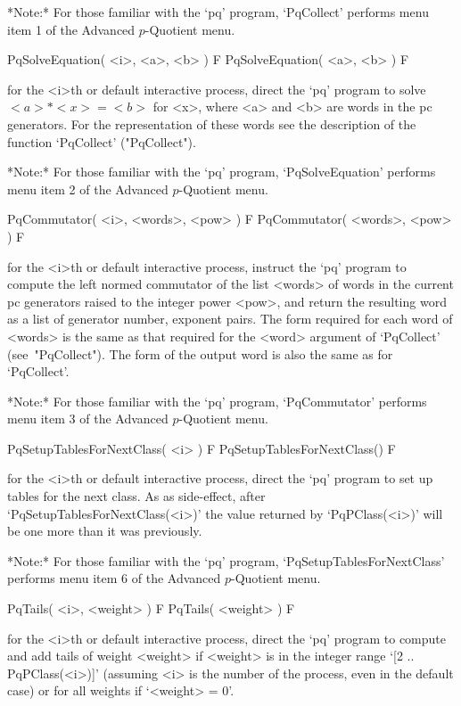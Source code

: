 \endlist

*Note:* For those familiar with the  `pq'  program,  `PqCollect'  performs
menu item 1 of the Advanced $p$-Quotient menu.

\>PqSolveEquation( <i>, <a>, <b> ) F
\>PqSolveEquation( <a>, <b> ) F

for the  <i>th or default  interactive {\ANUPQ} process, direct  the `pq'
program to solve $<a>  * <x> = <b>$ for <x>, where  <a> and <b> are words
in the pc generators. For the  representation  of  these  words  see  the
description of the function `PqCollect' ("PqCollect").

*Note:* 
For those familiar  with  the  `pq'  program,  `PqSolveEquation'  performs
menu item 2 of the Advanced $p$-Quotient menu.

\>PqCommutator( <i>, <words>, <pow> ) F
\>PqCommutator( <words>, <pow> ) F

for the <i>th or default interactive {\ANUPQ} process, instruct the  `pq'
program to compute the left normed commutator  of  the  list  <words>  of
words in the current pc generators raised to the integer power <pow>, and
return the resulting word as a list of generator number, exponent  pairs.
The form required for each word of <words> is the same as  that  required
for the <word> argument of `PqCollect' (see~"PqCollect"). The form of the
output word is also the same as for `PqCollect'.

*Note:*
For those familiar with the `pq' program,  `PqCommutator'  performs  menu
item 3 of the Advanced $p$-Quotient menu.

\>PqSetupTablesForNextClass( <i> ) F
\>PqSetupTablesForNextClass() F

for the <i>th or default interactive {\ANUPQ} process,  direct  the  `pq'
program  to  set  up  tables  for  the  next  class.  As  as  side-effect,
after   `PqSetupTablesForNextClass(<i>)'   the    value    returned    by
`PqPClass(<i>)' will be one more than it was previously.

*Note:* 
For those familiar  with  the  `pq'  program,  `PqSetupTablesForNextClass'
performs menu item 6 of the Advanced $p$-Quotient menu.

\>PqTails( <i>, <weight> ) F
\>PqTails( <weight> ) F

for the <i>th or default interactive {\ANUPQ} process,  direct  the  `pq'
program to compute and add tails of weight <weight> if <weight> is in  the
integer range `[2 .. PqPClass(<i>)]' (assuming <i> is the number  of  the
process, even in the default case) or for all weights if `<weight> = 0'.

